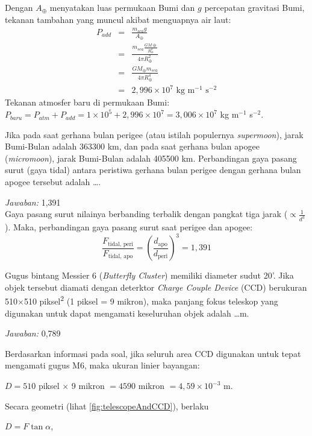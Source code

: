 \documentclass[11pt,fleqn]{exam}
\begin{document}
\begin{questions}
Dengan $A_{\oplus}$ menyatakan luas permukaan Bumi dan $g$ percepatan gravitasi Bumi, tekanan tambahan yang muncul akibat menguapnya air laut:
\begin{eqnarray*}
P_{add}&=&\frac{m_{sea}g}{A_{\oplus}}\\
&=&\frac{m_{sea}\frac{GM{\oplus}}{R_{\oplus}^2}}{4\pi R_{\oplus}^2}\\
&=&\frac{GM_{\oplus}m_{sea}}{4\pi R_{\oplus}^4}\\
&=&2,996\times 10^7 \text{ kg m$^{-1}$ s$^{-2}$}
\end{eqnarray*}
Tekanan atmosfer baru di permukaan Bumi: $P_{baru}=P_{atm}+P_{add}=1\times 10^5+2,996\times 10^7=3,006\times 10^7$  kg m$^{-1}$ s$^{-2}$.

\question Jika pada saat gerhana bulan perigee (atau istilah populernya \textit{supermoon}), jarak Bumi-Bulan adalah 363300 km, dan pada saat gerhana bulan apogee (\textit{micromoon}), jarak Bumi-Bulan adalah 405500 km. Perbandingan gaya pasang surut (gaya tidal) antara peristiwa gerhana bulan perigee dengan gerhana bulan apogee tersebut adalah \ldots.

\textit{Jawaban: }1,391\\
Gaya pasang surut nilainya berbanding terbalik dengan pangkat tiga jarak ($\propto \frac{1}{d^3}$). Maka, perbandingan gaya pasang surut saat perigee dan apogee: 
$$\frac{F_{\text{tidal, peri}}}{F_\text{tidal, apo}} = \left( \frac{d_{\text{apo}}}{d_{\text{peri}}} \right)^{3}=1,391$$

\question Gugus bintang Messier 6 (\textit{Butterfly Cluster}) memiliki diameter sudut 20'. Jika objek tersebut diamati dengan deterktor \textit{Charge Couple Device} (CCD) berukuran 510$\times$510 piksel\textsuperscript{2} (1 piksel = 9 mikron), maka panjang fokus teleskop yang digunakan untuk dapat mengamati keseluruhan objek adalah \ldots m.

\textit{Jawaban: } 0,789

Berdasarkan informasi pada soal, jika seluruh area CCD digunakan untuk tepat mengamati gugus M6, maka ukuran linier bayangan: 

$D = 510$ piksel $\times$ 9 mikron $=4590$ mikron $=4,59\times 10^{-3}$ m.

Secara geometri (lihat \autoref{fig:telescopeAndCCD}), berlaku 

$D = F \tan{\alpha}$, 


\end{questions}
\end{document}
